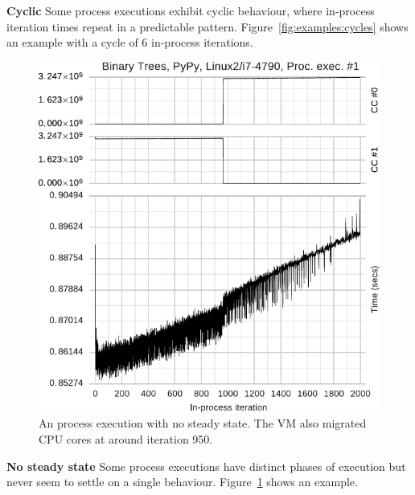 \documentclass[preprint,numbers,10pt]{sigplanconf}
\begin{document}
\textbf{Cyclic} \label{sub:cyclic}
Some process executions exhibit cyclic behaviour, where in-process iteration times
repeat in a predictable pattern. 
Figure~\ref{fig:examples:cycles} shows
an example with a cycle of 6 in-process iterations.


\begin{figure}[t]
\centering
\includegraphics[width=.45\textwidth]{examples/new_no_steady.pdf}
\caption{An process execution with no steady state. The VM also migrated CPU
cores at around iteration 950.}
\label{fig:examples:neverending}
\end{figure}

\textbf{No steady state} \label{sub:long}
Some process executions have distinct phases of execution but never seem to
settle on a single behaviour. Figure~\ref{fig:examples:neverending} shows an
example.
\end{document}

